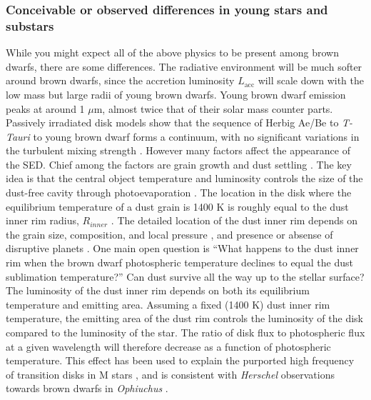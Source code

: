 \subsubsection{Conceivable or observed differences in young stars and substars}
While you might expect all of the above physics to be present among brown dwarfs, there are some differences.  The radiative environment will be much softer around brown dwarfs, since the accretion luminosity $L_{\mathrm{acc}}$ will scale down with the low mass but large radii of young brown dwarfs.  Young brown dwarf emission peaks at around 1 $\mu$m, almost twice that of their solar mass counter parts.  Passively irradiated disk models \citep{2003A&A...398..607D} show that the sequence of Herbig Ae/Be to \emph{T-Tauri} to young brown dwarf forms a continuum, with no significant variations in the turbulent mixing strength \citep{2012A&A...539A...9M}. However many factors affect the appearance of the SED.  Chief among the factors are grain growth and dust settling \citep{2010ApJ...712..925C}.  The key idea is that the central object temperature and luminosity controls the size of the dust-free cavity through photoevaporation \citep{2011ARA&A..49...67W}.  The location in the disk where the equilibrium temperature of a dust grain is 1400 K is roughly equal to the dust inner rim radius, $R_{inner}$ \citep{2001ApJ...560..957D}.  The detailed location of the dust inner rim depends on the grain size, composition, and local pressure \citep{2005A&A...438..899I}, and presence or absense of disruptive planets \citep{2014prpl.conf..667B,2015arXiv150302649P}.  One main open question is ``What happens to the dust inner rim when the brown dwarf photospheric temperature declines to equal the dust sublimation temperature?''  Can dust survive all the way up to the stellar surface?  The luminosity of the dust inner rim depends on both its equilibrium temperature and emitting area.  Assuming a fixed (1400 K) dust inner rim temperature, the emitting area of the dust rim controls the luminosity of the disk compared to the luminosity of the star.  The ratio of disk flux to photospheric flux at a given wavelength will therefore decrease as a function of photospheric temperature.  This effect has been used to explain the purported high frequency of transition disks in M stars \citep{2009MNRAS.394L.141E}, and is consistent with \emph{Herschel} observations towards brown dwarfs in \emph{Ophiuchus} \citep{2013A&A...559A.126A}.


